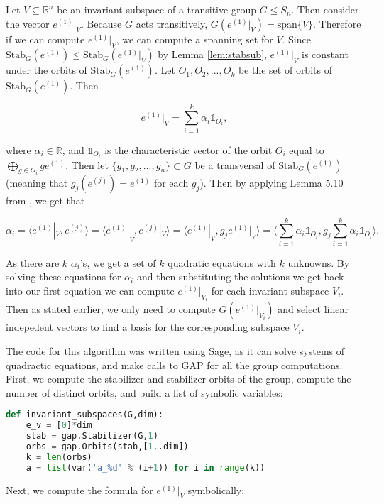 \documentclass[11pt]{article} %
\theoremstyle{definition}
\theoremstyle{remark}
\newcommand{\RR}{\mathbb{R}}
\newcommand{\myspan}[1]{\textrm{span} \lbrace {#1} \rbrace}
\newcommand{\stab}[2]{\textrm{Stab}_{#1}({#2})}
\begin{document}
Let $V \subseteq \RR^n$ be an invariant subspace of a transitive group $G \leq S_n$. Then consider the vector $e^{(1)}|_V$. Because $G$ acts transitively, $G(e^{(1)}|_V) = \myspan{V}$. Therefore if we can compute $e^{(1)}|_V$, we can compute a spanning set for $V$. Since $\stab{G}{e^{(1)}} \leq \stab{G}{e^{(1)}|_V}$ by Lemma \eqref{lem:stabsub}, $e^{(1)}|_V$ is constant under the orbits of $\stab{G}{e^{(1)}}$. Let $O_1, O_2, ..., O_k$ be the set of orbits of $\stab{G}{e^{(1)}}$. Then

\[ e^{(1)}|_V = \sum_{i=1}^{k} \alpha_i \mathds{1}_{O_i}, \]

where $\alpha_i \in \RR$, and $\mathds{1}_{O_i}$ is the characteristic vector of the orbit $O_i$ equal to $\bigoplus_{g \in O_i} ge^{(1)}$. Then let $\lbrace g_1, g_2, ..., g_n \rbrace \subset G$ be a transversal of $\stab{G}{e^{(1)}}$ (meaning that $g_j(e^{(j)}) = e^{(1)}$ for each $g_j$). Then by applying Lemma 5.10 from \cite{rehn}, we get that

\[ \alpha_i = \langle e^{(1)}|_V, e^{(j)} \rangle = \langle e^{(1)}|_V, e^{(j)}|_V \rangle = \langle e^{(1)}|_V, g_j e^{(1)}|_V \rangle = \langle \sum_{i=1}^{k} \alpha_i \mathds{1}_{O_i}, g_j \sum_{i=1}^{k} \alpha_i \mathds{1}_{O_i} \rangle .\]

As there are $k$ $\alpha_i$'s, we get a set of $k$ quadratic equations with $k$ unknowns. By solving these equations for $\alpha_i$ and then substituting the solutions we get back into our first equation we can compute $e^{(1)}|_{V_i}$ for each invariant subspace $V_i$. Then as stated earlier, we only need to compute $G(e^{(1)}|_{V_i})$ and select linear indepedent vectors to find a basis for the corresponding subspace $V_i$.

The code for this algorithm was written using Sage, as it can solve systems of quadractic equations, and make calls to GAP for all the group computations. First, we compute the stabilizer and stabilizer orbits of the group, compute the number of distinct orbits, and build a list of symbolic variables:

\begin{lstlisting}[language=Python, frame=single]
def invariant_subspaces(G,dim):
    e_v = [0]*dim
    stab = gap.Stabilizer(G,1)
    orbs = gap.Orbits(stab,[1..dim]) 
    k = len(orbs)
    a = list(var('a_%d' % (i+1)) for i in range(k))
\end{lstlisting}

Next, we compute the formula for $e^{(1)}|_V$ symbolically:
\end{document}
